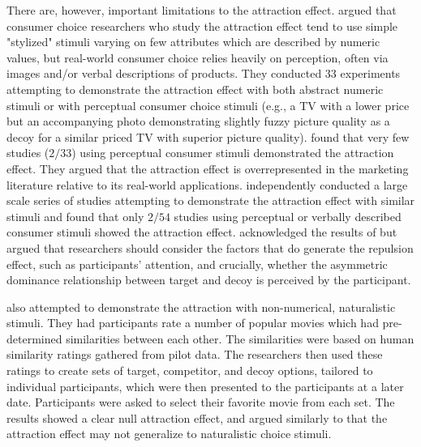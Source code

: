 There are, however, important limitations to the attraction effect. \textcite{frederickLimitsAttraction2014b} argued that consumer choice researchers who study the attraction effect tend to use simple "stylized" stimuli varying on few attributes which are described by numeric values, but real-world consumer choice relies heavily on perception, often via images and/or verbal descriptions of products. They conducted 33 experiments attempting to demonstrate the attraction effect with both abstract numeric stimuli or with perceptual consumer choice stimuli (e.g., a TV with a lower price but an accompanying photo demonstrating slightly fuzzy picture quality as a decoy for a similar priced TV with superior picture quality). \textcite{frederickLimitsAttraction2014b} found that very few studies ($2/33$) using perceptual consumer stimuli demonstrated the attraction effect. They argued that the attraction effect is overrepresented in the marketing literature relative to its real-world applications. \textcite{yangMoreEvidenceChallenging2014} independently conducted a large scale series of studies attempting to demonstrate the attraction effect with similar stimuli and found that only $2/54$ studies using perceptual or verbally described consumer stimuli showed the attraction effect. \textcite{simonson2014vices} acknowledged the results of \textcite{frederickLimitsAttraction2014b} but argued that researchers should consider the factors that do generate the repulsion effect, such as participants' attention, and crucially, whether the asymmetric dominance relationship between target and decoy is perceived by the participant. 

\textcite{trendlZeroAttractionEffect2021} also attempted to demonstrate the attraction with non-numerical, naturalistic stimuli. They had participants rate a number of popular movies which had pre-determined similarities between each other. The similarities were based on human similarity ratings gathered from pilot data. The researchers then used these ratings to create sets of target, competitor, and decoy options, tailored to individual participants, which were then presented to the participants at a later date. Participants were asked to select their favorite movie from each set. The results showed a clear null attraction effect, and \textcite{trendlZeroAttractionEffect2021} argued similarly to \textcite{frederickLimitsAttraction2014b} that the attraction effect may not generalize to naturalistic choice stimuli.


